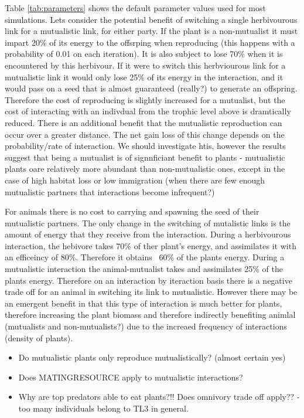 \begin{itemize}
Table \ref{tab:parameters} shows the default parameter values used for most simulations. Lets consider the potential benefit of switching a single herbivourous link for a mutualistic link, for either party. If the plant is a non-mutualist it must impart 20\% of its energy to the offsrping when reproducing (this happens with a probability of 0.01 on each iteration). It is also subject to lose 70\% when it is encountered by this herbivour. If it were to switch this herbviourous link for a mutualistic link it would only lose 25\% of its energy in the interaction, and it would pass on a seed that is almost guaranteed (really?) to generate an offspring. Therefore the cost of reproducing is slightly increased for a mutualist, but the cost of interacting with an indivdual from the trophic level above is dramtically reduced. There is an additional benefit that the mutualistic reproduction can occur over a greater distance. The net gain loss of this change depends on the probability/rate of interaction. We should investigate htis, however the results suggest that being a mutualist is of signnficiant benefit to plants - mutualistic plants oare relatively more abundant than non-mutualistic ones, except in the case of high habitat loss or low immigration (when there are few enough mutualistic partners that interactions become infrequent?) 

For animals there is no cost to carrying and spawning the seed of their mutualistic partners. The only change in the switching of mutalistic links is the amount of energy that they receive from the interaction. During a herbivourous interaction, the hebivore takes 70\% of ther plant's energy, and assimilates it with an efficeincy of 80\%. Therefore it obtains ~60\% of the plants energy. During a mutualistic interaction the animal-mutualist takes and assimilates 25\% of the plants energy. Therefore on an interaction by iteraction basis there is a negative trade off for an animal in switching its link to mutualistic. However there may be an emergent benefit in that this type of interaction is much better for plants, therefore increasing the plant biomass and therefore indirectly benefiting animlal (mutualists and non-mutualists?) due to the increaed frequency of interactions (density of plants).       

\begin{itemize}
	\item Do mutualistic plants only reproduce mutualistically? (almost certain yes)
	\item Does MATINGRESOURCE apply to mutualistic interactions?
	\item Why are top predators able to eat plants?!! Does omnivory trade off apply?? - too many individuals belong to TL3 in general.
\end{itemize}


\end{itemize}
